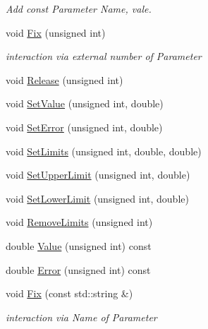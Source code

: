 \begin{DoxyCompactItemize}
\begin{DoxyCompactList}\small\item\em Add const Parameter Name, vale. \end{DoxyCompactList}\item 
void \mbox{\hyperlink{classROOT_1_1Minuit2_1_1MnUserParameters_a53ce277313d9e1f8503e7ffbf8e7bce4}{Fix}} (unsigned int)
\begin{DoxyCompactList}\small\item\em interaction via external number of Parameter \end{DoxyCompactList}\item 
void \mbox{\hyperlink{classROOT_1_1Minuit2_1_1MnUserParameters_a7bd8fe4d8f50de145f3f3abc6ec4fae4}{Release}} (unsigned int)
\item 
void \mbox{\hyperlink{classROOT_1_1Minuit2_1_1MnUserParameters_a6a2523d00c1b000fbc1c95da7a4a926a}{Set\+Value}} (unsigned int, double)
\item 
void \mbox{\hyperlink{classROOT_1_1Minuit2_1_1MnUserParameters_a64cbb6833d91d7f3bdef5b4dec9ae20f}{Set\+Error}} (unsigned int, double)
\item 
void \mbox{\hyperlink{classROOT_1_1Minuit2_1_1MnUserParameters_afa56296f97716c90cfbdd3f81d5caffc}{Set\+Limits}} (unsigned int, double, double)
\item 
void \mbox{\hyperlink{classROOT_1_1Minuit2_1_1MnUserParameters_a9127811ac07731aea64f1869a620d11b}{Set\+Upper\+Limit}} (unsigned int, double)
\item 
void \mbox{\hyperlink{classROOT_1_1Minuit2_1_1MnUserParameters_a5fa6d9f50413c05aabed1d11ee26c6cc}{Set\+Lower\+Limit}} (unsigned int, double)
\item 
void \mbox{\hyperlink{classROOT_1_1Minuit2_1_1MnUserParameters_a399fd2fff4e1055c0878c8ce24205544}{Remove\+Limits}} (unsigned int)
\item 
double \mbox{\hyperlink{classROOT_1_1Minuit2_1_1MnUserParameters_a5084b0d1312ddb87609ff726a11fd7f6}{Value}} (unsigned int) const
\item 
double \mbox{\hyperlink{classROOT_1_1Minuit2_1_1MnUserParameters_a08122c2515f2f3505ae14a26f7112dcc}{Error}} (unsigned int) const
\item 
void \mbox{\hyperlink{classROOT_1_1Minuit2_1_1MnUserParameters_a2ae09cd0fae9785d4c097439862ab63b}{Fix}} (const std\+::string \&)
\begin{DoxyCompactList}\small\item\em interaction via Name of Parameter \end{DoxyCompactList}\item 

\end{DoxyCompactItemize}
